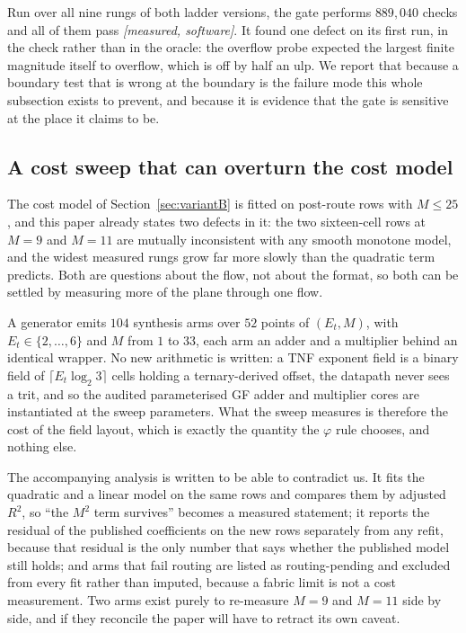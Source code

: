 Run over all nine rungs of both ladder versions, the gate performs $889{,}040$
checks and all of them pass \emph{[measured, software]}. It found one defect on
its first run, in the check rather than in the oracle: the overflow probe expected
the largest finite magnitude itself to overflow, which is off by half an ulp. We
report that because a boundary test that is wrong at the boundary is the failure
mode this whole subsection exists to prevent, and because it is evidence that the
gate is sensitive at the place it claims to be.

\subsection{A cost sweep that can overturn the cost model}
\label{sec:costsweep}

The cost model of Section~\ref{sec:variantB} is fitted on post-route rows with
$M \le 25$, and this paper already states two defects in it: the two sixteen-cell
rows at $M = 9$ and $M = 11$ are mutually inconsistent with any smooth monotone
model, and the widest measured rungs grow far more slowly than the quadratic term
predicts. Both are questions about the flow, not about the format, so both can be
settled by measuring more of the plane through one flow.

A generator emits $104$ synthesis arms over $52$ points of $(E_t, M)$, with
$E_t \in \{2,\dots,6\}$ and $M$ from $1$ to $33$, each arm an adder and a
multiplier behind an identical wrapper. No new arithmetic is written: a TNF
exponent field is a binary field of $\lceil E_t \log_2 3 \rceil$ cells holding a
ternary-derived offset, the datapath never sees a trit, and so the audited
parameterised GF adder and multiplier cores are instantiated at the sweep
parameters. What the sweep measures is therefore the cost of the field layout,
which is exactly the quantity the $\varphi$ rule chooses, and nothing else.

The accompanying analysis is written to be able to contradict us. It fits the
quadratic and a linear model on the same rows and compares them by adjusted
$R^2$, so ``the $M^2$ term survives'' becomes a measured statement; it reports the
residual of the published coefficients on the new rows separately from any refit,
because that residual is the only number that says whether the published model
still holds; and arms that fail routing are listed as routing-pending and
excluded from every fit rather than imputed, because a fabric limit is not a cost
measurement. Two arms exist purely to re-measure $M = 9$ and $M = 11$ side by side,
and if they reconcile the paper will have to retract its own caveat.

